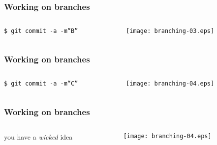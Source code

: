 \documentclass[english]{beamer}
\newcommand{\CMD}[1]{%
\texttt{\textcolor{code-blue}{#1}}%
}
\begin{document}
\begin{frame}
\frametitle{Working on branches}

\begin{columns}[t]
        \begin{column}[T]{.5\textwidth}
                {\small
                \CMD{\$ git commit -a -m``B''} \\
                }
        \end{column}
        \begin{column}[T]{.5\textwidth}
                \texttt{[image: branching-03.eps]}
        \end{column}
\end{columns}
\end{frame}

\begin{frame}
\frametitle{Working on branches}

\begin{columns}[t]
        \begin{column}[T]{.5\textwidth}
                {\small
                \CMD{\$ git commit -a -m``C''} \\
                }
        \end{column}
        \begin{column}[T]{.5\textwidth}
                \texttt{[image: branching-04.eps]}
        \end{column}
\end{columns}
\end{frame}

\begin{frame}
\frametitle{Working on branches}

\begin{columns}[t]
        \begin{column}[T]{.5\textwidth}
                you have a {\em wicked} idea
        \end{column}
        \begin{column}[T]{.5\textwidth}
                \texttt{[image: branching-04.eps]}
        \end{column}
\end{columns}
\end{frame}
\end{document}
